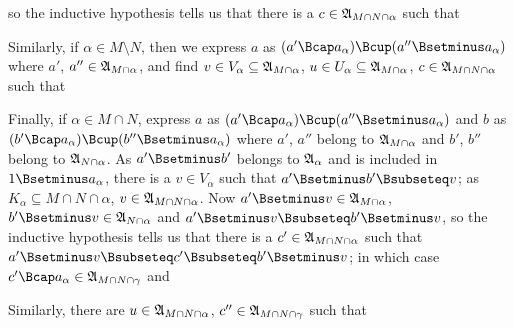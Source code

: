 {

\noindent so the inductive hypothesis tells us that there is a
$c\in\frak A_{M\cap N\cap\alpha}$ such that


\quad{} Similarly, if $\alpha\in M\setminus N$,
then we express $a$ as
$(a'\Bcap a_{\alpha})\Bcup(a''\Bsetminus a_{\alpha})$ where $a'$,
$a''\in\frak A_{M\cap\alpha}$, and find
$v\in V_{\alpha}\subseteq\frak A_{M\cap\alpha}$,
$u\in U_{\alpha}\subseteq\frak A_{M\cap\alpha}$,
$c\in\frak A_{M\cap N\cap\alpha}$ such that



\quad{} Finally, if $\alpha\in M\cap N$, express $a$ as
$(a'\Bcap a_{\alpha})\Bcup(a''\Bsetminus a_{\alpha})$ and
$b$ as $(b'\Bcap a_{\alpha})\Bcup\penalty-100(b''\Bsetminus a_{\alpha})$
where $a'$,
$a''$ belong to $\frak A_{M\cap\alpha}$ and $b'$, $b''$ belong to
$\frak A_{N\cap\alpha}$.   As $a'\Bsetminus b'$ belongs to
$\frak A_{\alpha}$ and is included in $1\Bsetminus a_{\alpha}$, there is
a $v\in V_{\alpha}$ such that $a'\Bsetminus b'\Bsubseteq v$;  as
$K_{\alpha}\subseteq M\cap N\cap\alpha$, $v\in\frak A_{M\cap N\cap\alpha}$.
Now $a'\Bsetminus v\in\frak A_{M\cap\alpha}$,
$b'\Bsetminus v\in\frak A_{N\cap\alpha}$ and
$a'\Bsetminus v\Bsubseteq b'\Bsetminus v$, so the inductive hypothesis
tells us that there is a $c'\in\frak A_{M\cap N\cap\alpha}$ such that
$a'\Bsetminus v\Bsubseteq c'\Bsubseteq b'\Bsetminus v$;  in which case
$c'\Bcap a_{\alpha}\in\frak A_{M\cap N\cap\gamma}$ and


\noindent Similarly, there are $u\in\frak A_{M\cap N\cap\alpha}$,
$c''\in\frak A_{M\cap N\cap\gamma}$ such that


}
